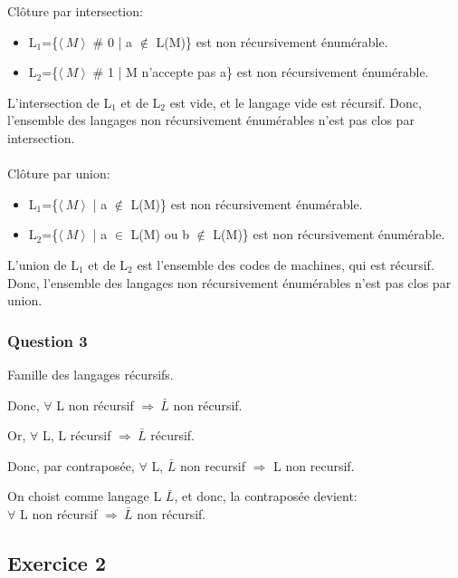 Cl\^oture par intersection:

\begin{itemize}
  \item L$_1$=\{$\langle\ M\ \rangle \!\ $
  \# 0 | a $\not\in$ L(M)\} est
  non r\'ecursivement \'enum\'erable.
  \item L$_2$=\{$\langle\ M\ \rangle \!\ $
  \# 1 | M n'accepte pas a\} est
  non r\'ecursivement \'enum\'erable.
\end{itemize}

L'intersection de L$_1$ et de L$_2$ est
vide, et le langage vide est r\'ecursif.
Donc, l'ensemble des langages
non r\'ecursivement \'enum\'erables
n'est pas clos par intersection.\\\\

Cl\^oture par union:

\begin{itemize}
  \item L$_1$=\{$\langle\ M\ \rangle \!\ $
  | a $\not\in$ L(M)\} est
  non r\'ecursivement \'enum\'erable.
  \item L$_2$=\{$\langle\ M\ \rangle \!\ $
  | a $\in$ L(M) ou b $\not\in$ L(M)\} est
  non r\'ecursivement \'enum\'erable.
\end{itemize}

L'union de L$_1$ et de L$_2$ est
l'ensemble des codes de machines, qui est
r\'ecursif.\\
Donc, l'ensemble des langages
non r\'ecursivement \'enum\'erables
n'est pas clos par union.

\subsubsection{Question 3}

Famille des langages r\'ecursifs.

Donc, $\forall$ L non r\'ecursif
$\Rightarrow~\bar{L}$ non r\'ecursif.

Or, $\forall$ L, L r\'ecursif
$\Rightarrow~\bar{L}$ r\'ecursif.

Donc, par contrapos\'ee,
$\forall$ L, $\bar{L}$ non recursif
$\Rightarrow$ L non recursif.

On choist comme langage L $\bar{L}$, et donc,
la contrapos\'ee devient:\\
$\forall$ L non r\'ecursif
$\Rightarrow~\bar{L}$ non r\'ecursif.

\subsection{Exercice 2}

